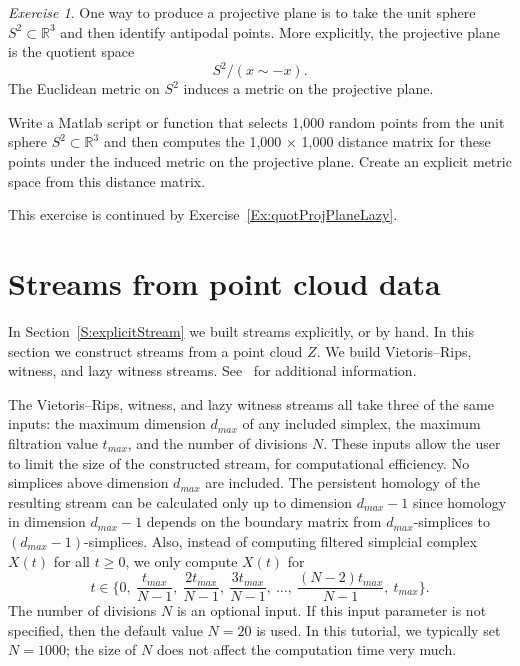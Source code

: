 \documentclass[amscd, amssymb, verbatim]{amsart}[12pt]
\theoremstyle{remark}
\newtheorem{exercise}{Exercise}
\theoremstyle{remark}
\theoremstyle{remark}
\newcommand{\R}{\mathbb{R}}
\begin{document}
\begin{exercise}\label{Ex:quotProjPlane}
One way to produce a projective plane is to take the unit sphere $S^2 \subset \R^3$ and then identify antipodal points. More explicitly, the projective plane is the quotient space 
$$S^2 / (x \sim -x).$$
The Euclidean metric on $S^2$ induces a metric on the projective plane.

Write a Matlab script or function that selects 1,000 random points from the unit sphere $S^2 \subset \R^3$ and then computes the 1,000 $\times$ 1,000 distance matrix for these points under the induced metric on the projective plane. Create an explicit metric space from this distance matrix. 

This exercise is continued by Exercise~\ref{Ex:quotProjPlaneLazy}. 
\end{exercise}




\section{Streams from point cloud data}\label{S:sfpc}

In Section~\ref{S:explicitStream} we built streams explicitly, or by hand. In this section we construct streams from a point cloud $Z$. We build Vietoris--Rips, witness, and lazy witness streams. See~\citet{WitnessComplexes} for additional information. 

The Vietoris--Rips, witness, and lazy witness streams all take three of the same inputs: the maximum dimension $d_{max}$ of any included simplex, the maximum filtration value $t_{max}$, and the number of divisions $N$. These inputs allow the user to limit the size of the constructed stream, for computational efficiency. No simplices above dimension $d_{max}$ are included. The persistent homology of the resulting stream can be calculated only up to dimension $d_{max} - 1$ since homology in dimension $d_{max}-1$ depends on the boundary matrix from $d_{max}$-simplices to $(d_{max}-1)$-simplices. Also, instead of computing filtered simplcial complex $X(t)$ for all $t \geq 0$, we only compute $X(t)$ for
$$t \in \Biggl\{ 0,\ \frac{t_{max}}{N-1},\ \frac{2t_{max}}{N-1},\ \frac{3t_{max}}{N-1},\ \dots,\ \frac{(N-2)t_{max}}{N-1},\ t_{max} \Biggr\}.$$
The number of divisions $N$ is an optional input. If this input parameter is not specified, then the default value $N = 20$ is used. In this tutorial, we typically set $N=1000$; the size of $N$ does not affect the computation time very much.
\end{document}

